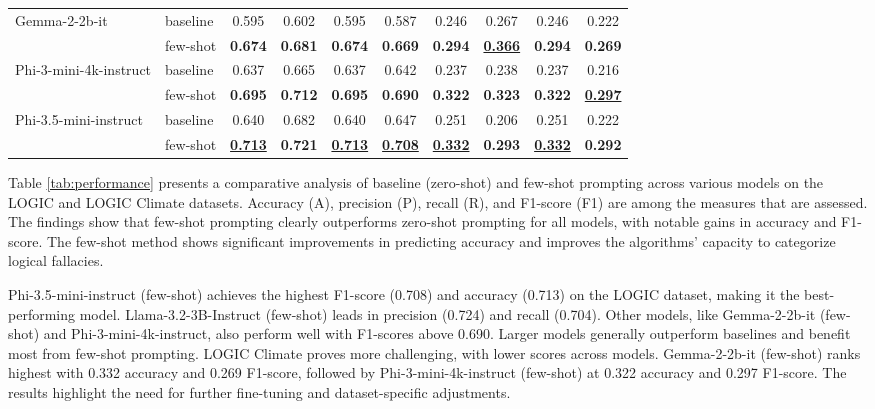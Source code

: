 \documentclass[runningheads]{llncs}
\begin{document}
\begin{table}[!ht]
\begin{adjustbox}{max width=\textwidth}
\begin{tabular}{llcccccccc}
\midrule
\multirow{2}{*}{Gemma-2-2b-it} & baseline & 0.595 & 0.602 & 0.595 & 0.587 & 0.246 & 0.267 & 0.246 & 0.222 \\
& few-shot & \textbf{0.674} & \textbf{0.681} & \textbf{0.674} & \textbf{0.669} & \textbf{0.294} & \underline{\textbf{0.366}} & \textbf{0.294} & \textbf{0.269} \\
\midrule
\multirow{2}{*}{Phi-3-mini-4k-instruct} & baseline & 0.637 & 0.665 & 0.637 & 0.642 & 0.237 & 0.238 & 0.237 & 0.216 \\
& few-shot & \textbf{0.695} & \textbf{0.712} & \textbf{0.695} & \textbf{0.690} & \textbf{0.322} & \textbf{0.323} & \textbf{0.322} & \underline{\textbf{0.297}} \\
\midrule
\multirow{2}{*}{Phi-3.5-mini-instruct} & baseline & 0.640 & 0.682 & 0.640 & 0.647 & 0.251 & 0.206 & 0.251 & 0.222 \\
& few-shot & \underline{\textbf{0.713}} & \textbf{0.721} & \underline{\textbf{0.713}} & \underline{\textbf{0.708}} & \underline{\textbf{0.332}} & \textbf{0.293} & \underline{\textbf{0.332}} & \textbf{0.292} \\
\bottomrule
\end{tabular}
\end{adjustbox}
\end{table}

Table \ref{tab:performance} presents a comparative analysis of baseline (zero-shot) and few-shot prompting across various models on the LOGIC and LOGIC Climate datasets. Accuracy (A), precision (P), recall (R), and F1-score (F1) are among the measures that are assessed. The findings show that few-shot prompting clearly outperforms zero-shot prompting for all models, with notable gains in accuracy and F1-score. The few-shot method shows significant improvements in predicting accuracy and improves the algorithms' capacity to categorize logical fallacies.

Phi-3.5-mini-instruct (few-shot) achieves the highest F1-score (0.708) and accuracy (0.713) on the LOGIC dataset, making it the best-performing model. Llama-3.2-3B-Instruct (few-shot) leads in precision (0.724) and recall (0.704). Other models, like Gemma-2-2b-it (few-shot) and Phi-3-mini-4k-instruct, also perform well with F1-scores above 0.690. Larger models generally outperform baselines and benefit most from few-shot prompting. LOGIC Climate proves more challenging, with lower scores across models. Gemma-2-2b-it (few-shot) ranks highest with 0.332 accuracy and 0.269 F1-score, followed by Phi-3-mini-4k-instruct (few-shot) at 0.322 accuracy and 0.297 F1-score. The results highlight the need for further fine-tuning and dataset-specific adjustments.
\end{document}
